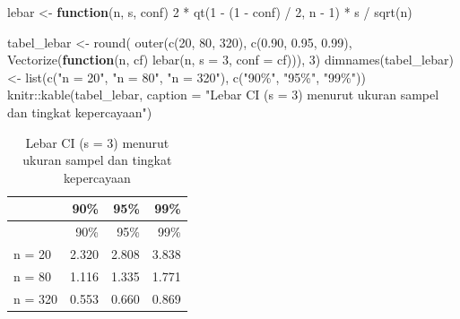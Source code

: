 \documentclass[
  indonesian,
  letterpaper,
]{book}
\newenvironment{Shaded}{\begin{snugshade}}{\end{snugshade}}
\newcommand{\AttributeTok}[1]{\textcolor[rgb]{0.40,0.45,0.13}{#1}}
\newcommand{\ControlFlowTok}[1]{\textcolor[rgb]{0.00,0.23,0.31}{\textbf{#1}}}
\newcommand{\DecValTok}[1]{\textcolor[rgb]{0.68,0.00,0.00}{#1}}
\newcommand{\FloatTok}[1]{\textcolor[rgb]{0.68,0.00,0.00}{#1}}
\newcommand{\FunctionTok}[1]{\textcolor[rgb]{0.28,0.35,0.67}{#1}}
\newcommand{\NormalTok}[1]{\textcolor[rgb]{0.00,0.23,0.31}{#1}}
\newcommand{\OtherTok}[1]{\textcolor[rgb]{0.00,0.23,0.31}{#1}}
\newcommand{\SpecialCharTok}[1]{\textcolor[rgb]{0.37,0.37,0.37}{#1}}
\newcommand{\StringTok}[1]{\textcolor[rgb]{0.13,0.47,0.30}{#1}}
\begin{document}
\begin{Shaded}
\begin{Highlighting}[]
\NormalTok{lebar }\OtherTok{\textless{}{-}} \ControlFlowTok{function}\NormalTok{(n, s, conf) }\DecValTok{2} \SpecialCharTok{*} \FunctionTok{qt}\NormalTok{(}\DecValTok{1} \SpecialCharTok{{-}}\NormalTok{ (}\DecValTok{1} \SpecialCharTok{{-}}\NormalTok{ conf) }\SpecialCharTok{/} \DecValTok{2}\NormalTok{, n }\SpecialCharTok{{-}} \DecValTok{1}\NormalTok{) }\SpecialCharTok{*}\NormalTok{ s }\SpecialCharTok{/} \FunctionTok{sqrt}\NormalTok{(n)}

\NormalTok{tabel\_lebar }\OtherTok{\textless{}{-}} \FunctionTok{round}\NormalTok{(}
  \FunctionTok{outer}\NormalTok{(}\FunctionTok{c}\NormalTok{(}\DecValTok{20}\NormalTok{, }\DecValTok{80}\NormalTok{, }\DecValTok{320}\NormalTok{), }\FunctionTok{c}\NormalTok{(}\FloatTok{0.90}\NormalTok{, }\FloatTok{0.95}\NormalTok{, }\FloatTok{0.99}\NormalTok{),}
        \FunctionTok{Vectorize}\NormalTok{(}\ControlFlowTok{function}\NormalTok{(n, cf) }\FunctionTok{lebar}\NormalTok{(n, }\AttributeTok{s =} \DecValTok{3}\NormalTok{, }\AttributeTok{conf =}\NormalTok{ cf))),}
  \DecValTok{3}\NormalTok{)}
\FunctionTok{dimnames}\NormalTok{(tabel\_lebar) }\OtherTok{\textless{}{-}} \FunctionTok{list}\NormalTok{(}\FunctionTok{c}\NormalTok{(}\StringTok{"n = 20"}\NormalTok{, }\StringTok{"n = 80"}\NormalTok{, }\StringTok{"n = 320"}\NormalTok{),}
                              \FunctionTok{c}\NormalTok{(}\StringTok{"90\%"}\NormalTok{, }\StringTok{"95\%"}\NormalTok{, }\StringTok{"99\%"}\NormalTok{))}
\NormalTok{knitr}\SpecialCharTok{::}\FunctionTok{kable}\NormalTok{(tabel\_lebar,}
             \AttributeTok{caption =} \StringTok{"Lebar CI (s = 3) menurut ukuran sampel dan tingkat kepercayaan"}\NormalTok{)}
\end{Highlighting}
\end{Shaded}

\begin{longtable}[]{@{}lrrr@{}}
\caption{Lebar CI (s = 3) menurut ukuran sampel dan tingkat
kepercayaan}\tabularnewline
\toprule\noalign{}
& 90\% & 95\% & 99\% \\
\midrule\noalign{}
\endfirsthead
\toprule\noalign{}
& 90\% & 95\% & 99\% \\
\midrule\noalign{}
\endhead
\bottomrule\noalign{}
\endlastfoot
n = 20 & 2.320 & 2.808 & 3.838 \\
n = 80 & 1.116 & 1.335 & 1.771 \\
n = 320 & 0.553 & 0.660 & 0.869 \\
\end{longtable}
\end{document}
